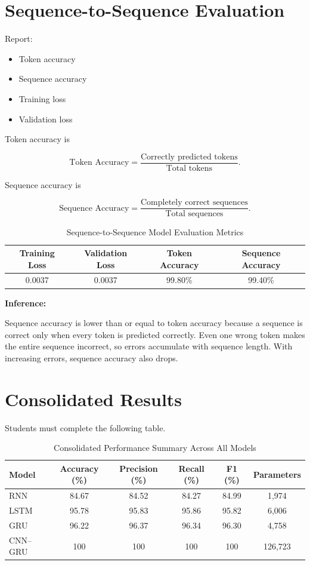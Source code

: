 \documentclass[10pt]{article}
\begin{document}
\section{Sequence-to-Sequence Evaluation}

Report:

\begin{itemize}
\item Token accuracy
\item Sequence accuracy
\item Training loss
\item Validation loss
\end{itemize}

Token accuracy is

\[
\text{Token Accuracy}
=
\frac{\text{Correctly predicted tokens}}
{\text{Total tokens}}.
\]

Sequence accuracy is

\[
\text{Sequence Accuracy}
=
\frac{\text{Completely correct sequences}}
{\text{Total sequences}}.
\]

\begin{table}[H]
\centering
\begin{tabular}{|c|c|c|c|}
\hline
\textbf{Training Loss} & \textbf{Validation Loss} & \textbf{Token Accuracy} & \textbf{Sequence Accuracy}\\
\hline
0.0037 & 0.0037 & 99.80\% & 99.40\%\\
\hline
\end{tabular}
\caption{Sequence-to-Sequence Model Evaluation Metrics}
\label{tab:seq2seq_eval}
\end{table}

\textbf{Inference:}

Sequence accuracy is lower than or equal to token accuracy because a sequence is correct only when every token is predicted correctly. Even one wrong token makes the entire sequence incorrect, so errors accumulate with sequence length. With increasing errors, sequence accuracy also drops.
\section{Consolidated Results}

Students must complete the following table.

\begin{table}[H]
\centering
\begin{tabular}{|l|c|c|c|c|c|}
\hline
Model & Accuracy (\%) & Precision (\%) & Recall (\%) & F1 (\%) & Parameters\\
\hline
RNN & 84.67 & 84.52 & 84.27 & 84.99 & 1,974\\
LSTM & 95.78 & 95.83 & 95.86& 95.82 & 6,006\\
GRU & 96.22 & 96.37 & 96.34 & 96.30 & 4,758\\
CNN--GRU & 100 & 100 & 100 & 100 & 126,723\\
\hline
\end{tabular}
\caption{Consolidated Performance Summary Across All Models}
\label{tab:consolidated_results}
\end{table}
\end{document}
